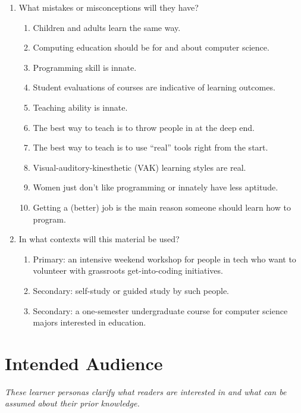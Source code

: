 \begin{enumerate}
\item
  What mistakes or misconceptions will they have?
  \begin{enumerate}
  \item
    Children and adults learn the same way.
  \item
    Computing education should be for and about computer science.
  \item
    Programming skill is innate.
  \item
    Student evaluations of courses are indicative of learning outcomes.
  \item
    Teaching ability is innate.
  \item
    The best way to teach is to throw people in at the deep end.
  \item
    The best way to teach is to use ``real'' tools right from the start.
  \item
    Visual-auditory-kinesthetic (VAK) learning styles are real.
  \item
    Women just don't like programming or innately have less aptitude.
  \item
    Getting a (better) job is the main reason someone should learn how to program.
  \end{enumerate}

\item
  In what contexts will this material be used?
  \begin{enumerate}
  \item
    Primary: an intensive weekend workshop for people in tech who want
    to volunteer with grassroots get-into-coding initiatives.
  \item
    Secondary: self-study or guided study by such people.
  \item
    Secondary: a one-semester undergraduate course for computer
    science majors interested in education.
  \end{enumerate}

\end{enumerate}

\section*{Intended Audience}

\emph{These learner personas clarify what readers are interested in and what can
be assumed about their prior knowledge.}

